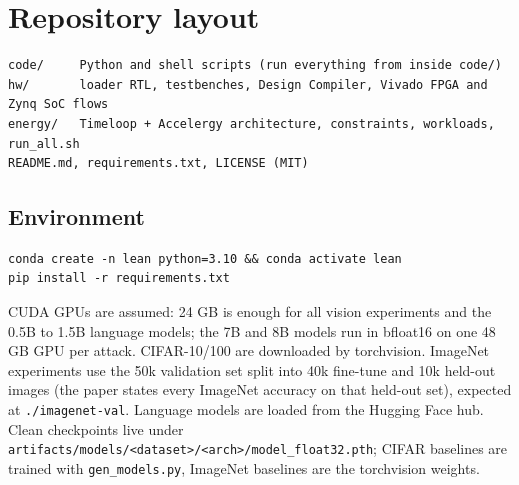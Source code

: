 \documentclass[11pt]{article}
\begin{document}
\section{Repository layout}
\begin{lstlisting}
code/     Python and shell scripts (run everything from inside code/)
hw/       loader RTL, testbenches, Design Compiler, Vivado FPGA and Zynq SoC flows
energy/   Timeloop + Accelergy architecture, constraints, workloads, run_all.sh
README.md, requirements.txt, LICENSE (MIT)
\end{lstlisting}

\subsection{Environment}
\begin{lstlisting}
conda create -n lean python=3.10 && conda activate lean
pip install -r requirements.txt
\end{lstlisting}
CUDA GPUs are assumed: 24 GB is enough for all vision experiments and the 0.5B to 1.5B language models; the 7B and 8B models run in bfloat16 on one 48 GB GPU per attack. CIFAR-10/100 are downloaded by torchvision. ImageNet experiments use the 50k validation set split into 40k fine-tune and 10k held-out images (the paper states every ImageNet accuracy on that held-out set), expected at \texttt{./imagenet-val}. Language models are loaded from the Hugging Face hub. Clean checkpoints live under \texttt{artifacts/models/<dataset>/<arch>/model\_float32.pth}; CIFAR baselines are trained with \texttt{gen\_models.py}, ImageNet baselines are the torchvision weights.
\end{document}
